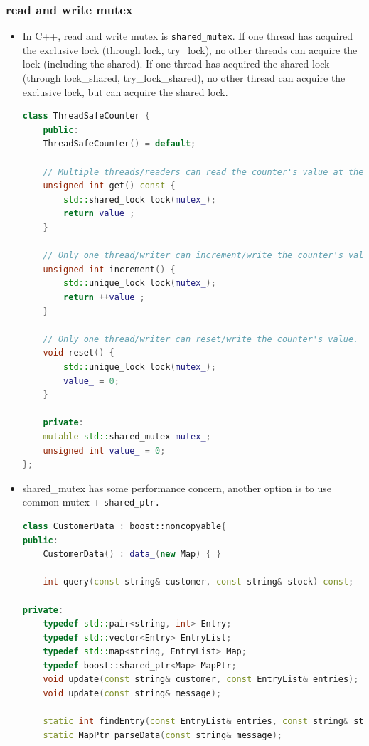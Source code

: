 \documentclass[a4paper,11pt,twoside]{book}
\begin{document}
\subsubsection{read and write mutex}

\begin{itemize}

    \item In C++, read and write mutex is \texttt{shared\_mutex}. If one thread has acquired the exclusive lock (through lock, try\_lock), no other threads can acquire the lock (including the shared). If one thread has acquired the shared lock (through lock\_shared, try\_lock\_shared), no other thread can acquire the exclusive lock, but can acquire the shared lock.

\begin{lstlisting}[frame=single, language=c++]	
class ThreadSafeCounter {
	public:
	ThreadSafeCounter() = default;
	
	// Multiple threads/readers can read the counter's value at the same time.
	unsigned int get() const {
		std::shared_lock lock(mutex_);
		return value_;
	}
	
	// Only one thread/writer can increment/write the counter's value.
	unsigned int increment() {
		std::unique_lock lock(mutex_);
		return ++value_;
	}
	
	// Only one thread/writer can reset/write the counter's value.
	void reset() {
		std::unique_lock lock(mutex_);
		value_ = 0;
	}
	
	private:
	mutable std::shared_mutex mutex_;
	unsigned int value_ = 0;
};	
\end{lstlisting}

    \item shared\_mutex has some performance concern, another option is to use common mutex + \texttt{shared\_ptr.}

\begin{lstlisting}[frame=single, language=c++]	
class CustomerData : boost::noncopyable{
public:
	CustomerData() : data_(new Map) { }
	
	int query(const string& customer, const string& stock) const;
	
private:
	typedef std::pair<string, int> Entry;
	typedef std::vector<Entry> EntryList;
	typedef std::map<string, EntryList> Map;
	typedef boost::shared_ptr<Map> MapPtr;
	void update(const string& customer, const EntryList& entries);
	void update(const string& message);
	
	static int findEntry(const EntryList& entries, const string& stock);
	static MapPtr parseData(const string& message);
	

\end{lstlisting}
\end{itemize}
\end{document}
